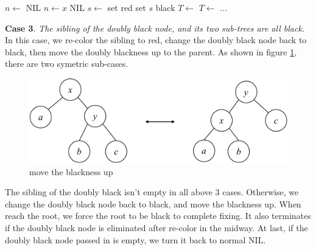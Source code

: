 \documentclass[b5paper]{article}
\begin{document}
\begin{algorithmic}[1]
  \State $n \gets$ NIL
    
    \State $n \gets x$
  \EndIf
   
    \State \Return NIL
  \EndIf
        \State $s \gets$ 
           
          \State set  red
          \State set $s$ black
           
            \State $T \gets$ 
          \Else {}
            \State $T \gets$ 
          \EndIf
          \State ...
        \EndIf
    \EndIf
  \EndWhile
\EndFunction
\end{algorithmic}

\textbf{Case 3}. {\em The sibling of the doubly black node, and its two sub-trees are all black.} In this case, we re-color the sibling to red, change the doubly black node back to black, then move the doubly blackness up to the parent. As shown in figure \cref{fig:del-case3}, there are two symetric sub-cases.

\begin{figure}[htbp]
  \centering
  \includegraphics[scale=0.4, page=5]{../../../datastruct/tree/red-black-tree/img/rbtree}
  \caption{move the blackness up}
  \label{fig:del-case3}
\end{figure}

The sibling of the doubly black isn't empty in all above 3 cases. Otherwise, we change the doubly black node back to black, and move the blackness up. When reach the root, we force the root to be black to complete fixing. It also terminates if the doubly black node is eliminated after re-color in the midway. At last, if the doubly black node passed in is empty, we turn it back to normal NIL.
\end{document}
